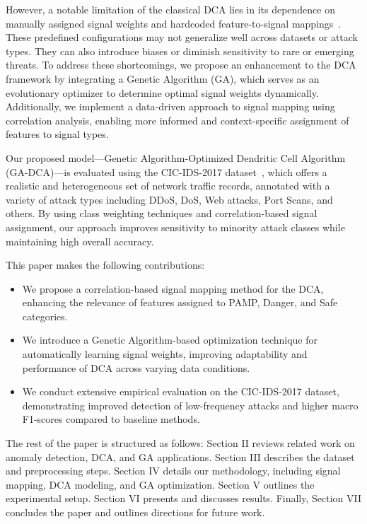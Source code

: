 \documentclass[conference]{IEEEtran}
\begin{document}
However, a notable limitation of the classical DCA lies in its
dependence on manually assigned signal weights and hardcoded
feature-to-signal mappings~\cite{mohsin_upper_2016}. These predefined configurations may not
generalize well across datasets or attack types. They can also
introduce biases or diminish sensitivity to rare or emerging threats.
To address these shortcomings, we propose an enhancement to the DCA
framework by integrating a Genetic Algorithm (GA), which serves as an
evolutionary optimizer to determine optimal signal weights
dynamically. Additionally, we implement a data-driven approach to
signal mapping using correlation analysis, enabling more informed and
context-specific assignment of features to signal types.

Our proposed model—Genetic Algorithm-Optimized Dendritic Cell
Algorithm (GA-DCA)—is evaluated using the CIC-IDS-2017
dataset~\cite{sharafaldin_toward_2018}, which
offers a realistic and heterogeneous set of network traffic records,
annotated with a variety of attack types including DDoS, DoS, Web
attacks, Port Scans, and others. By using class weighting techniques
and correlation-based signal assignment, our approach improves
sensitivity to minority attack
classes while maintaining high overall accuracy.

This paper makes the following contributions:
\begin{itemize}
  \item We propose a correlation-based signal mapping method for the
    DCA, enhancing the relevance of features assigned to PAMP,
    Danger, and Safe categories.
  \item We introduce a Genetic Algorithm-based optimization technique
    for automatically learning signal weights, improving adaptability
    and performance of DCA across varying data conditions.
  \item We conduct extensive empirical evaluation on the CIC-IDS-2017
    dataset, demonstrating improved detection of low-frequency
    attacks and higher macro F1-scores compared to baseline methods.
\end{itemize}

The rest of the paper is structured as follows: Section II reviews
related work on anomaly detection, DCA, and GA applications. Section
III describes the dataset and preprocessing steps. Section IV details
our methodology, including signal mapping, DCA modeling, and GA
optimization. Section V outlines the experimental setup. Section VI
presents and discusses results. Finally, Section VII concludes the
paper and outlines directions for future work.
\end{document}
